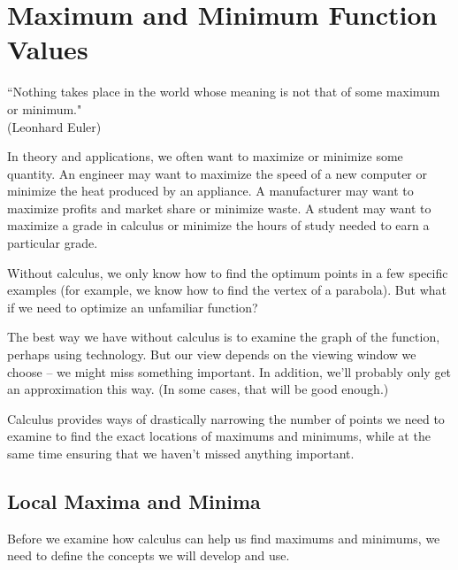 \section{Maximum and Minimum Function Values}
\label{sec:optimization}
\begin{center}
``Nothing takes place in the world whose meaning is not that of some maximum or minimum." \\ 
(Leonhard Euler)
\end{center}

In theory and applications, we often want to maximize or minimize some quantity. An engineer may want to maximize the speed of a new computer or minimize the heat produced by an appliance. A manufacturer may want to maximize profits and market share or minimize waste. A student may want to maximize a grade in calculus or minimize the hours of study needed to earn a particular grade.

Without calculus, we only know how to find the optimum points in a few specific examples (for example, we know how to find the vertex of a parabola). But what if we need to optimize an unfamiliar function?

The best way we have without calculus is to examine the graph of the function, perhaps using technology. But our view depends on the viewing window we choose -- we might miss something important. In addition, we'll probably only get an approximation this way. (In some cases, that will be good enough.)

Calculus provides ways of drastically narrowing the number of points we need to examine to find the exact locations of maximums and minimums, while at the same time ensuring that we haven't missed anything important.

\subsection{Local Maxima and Minima}
Before we examine how calculus can help us find maximums and minimums, we need to define the concepts we will develop and use.

